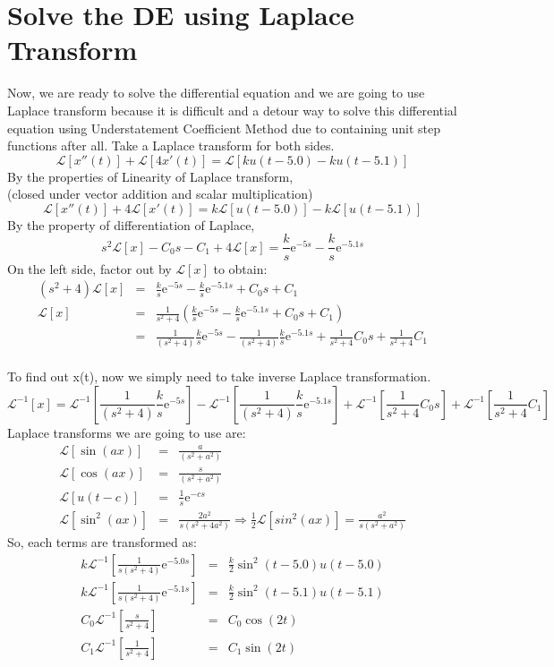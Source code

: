 \documentclass[12pt,letterpaper,fleqn]{article}
\begin{document}
\section{Solve the DE using Laplace Transform}
Now, we are ready to solve the differential equation and we are going to use Laplace transform because it is difficult and a detour way to solve this differential equation using Understatement Coefficient Method due to containing unit step functions after all.
Take a Laplace transform for both sides.
$$\mathcal{L}[x''(t) ] +\mathcal{L}[4x'(t)] = \mathcal{L}[ku(t-5.0)-ku(t-5.1)] $$
By the properties of Linearity of Laplace transform,\\
(closed under vector addition and scalar multiplication)
$$\mathcal{L}[x''(t)] + 4\mathcal{L}[x'(t)] = k\mathcal{L}[u(t-5.0)] - k\mathcal{L}[u(t-5.1)]$$
By the property of differentiation of Laplace, 
$$ s^2\mathcal{L}[x]-C_0s-C_1+4\mathcal{L}[x] = \frac{k}{s}\mathrm{e}^{-5s}-\frac{k}{s}\mathrm{e}^{-5.1s}  $$ 
On the left side, factor out by $ \mathcal{L}[x]$ to obtain:
\begin{eqnarray*}
(s^2 + 4)\mathcal{L}[x] &=& \frac{k}{s}\mathrm{e}^{-5s}-\frac{k}{s}\mathrm{e}^{-5.1s}+C_0s+C_1\\
\mathcal{L}[x] &=& \frac{1}{s^2 + 4}(\frac{k}{s}\mathrm{e}^{-5s}-\frac{k}{s}\mathrm{e}^{-5.1s}+C_0s+C_1)\\
&=&\frac{1}{(s^2 + 4)}\frac{k}{s}\mathrm{e}^{-5s}-\frac{1}{(s^2 + 4)}\frac{k}{s}\mathrm{e}^{-5.1s}+\frac{1}{s^2 + 4}C_0s+\frac{1}{s^2 + 4}C_1
\end{eqnarray*}\\
To find out x(t), now we simply need to take inverse Laplace transformation.
$$\mathcal{L}^{-1}[x] = \mathcal{L}^{-1}[\frac{1}{(s^2 + 4)}\frac{k}{s}\mathrm{e}^{-5s}]-\mathcal{L}^{-1}[\frac{1}{(s^2 + 4)}\frac{k}{s}\mathrm{e}^{-5.1s}]+\mathcal{L}^{-1}[\frac{1}{s^2 + 4}C_0s]+\mathcal{L}^{-1}[\frac{1}{s^2 + 4}C_1]$$
Laplace transforms we are going to use are:
\begin{eqnarray*}
\mathcal{L}[\sin(ax)] &=& \frac{a}{(s^2+a^2)}\\
\mathcal{L}[\cos(ax)] &=& \frac{s}{(s^2+a^2)}\\
\mathcal{L}[u(t-c)] &=& \frac{1}{s}\mathrm{e}^{-cs}\\
\mathcal{L}[\sin^{2}(ax)] &=& \frac{2a^2}{s(s^2+4a^2)} \Rightarrow \frac{1}{2}\mathcal{L}[sin^{2}(ax)] = \frac{a^2}{s(s^2+a^2)}
\end{eqnarray*}
So, each terms are transformed as:\\
\begin{eqnarray*}
k\mathcal{L}^{-1}[\frac{1}{s(s^2+4)}\mathrm{e}^{-5.0s}] &=& \frac{k}{2}\sin^{2}(t-5.0)u(t-5.0)\\
k\mathcal{L}^{-1}[\frac{1}{s(s^2+4)}\mathrm{e}^{-5.1s}] &=& \frac{k}{2}\sin^{2}(t-5.1)u(t-5.1)\\
C_0\mathcal{L}^{-1}[\frac{s}{s^2+4}] &=& C_0\cos(2t)\\
C_1\mathcal{L}^{-1}[\frac{1}{s^2+4}] &=& C_1\sin(2t)\\
\end{eqnarray*}
\end{document}
